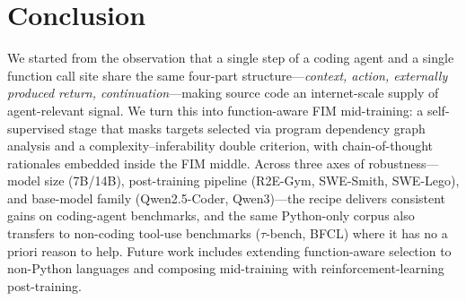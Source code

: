 \section{Conclusion}
\vspace{-0.5ex}
\label{sec:conclusion}

We started from the observation that a single step of a coding agent and
a single function call site share the same four-part structure---\textit{context,
action, externally produced return, continuation}---making source code an
internet-scale supply of agent-relevant signal. We turn this into
function-aware FIM mid-training: a self-supervised stage that masks
targets selected via program dependency graph analysis and a
complexity--inferability double criterion, with chain-of-thought
rationales embedded inside the FIM middle. Across three axes of
robustness---model size (7B/14B), post-training pipeline (R2E-Gym,
SWE-Smith, SWE-Lego), and base-model family (Qwen2.5-Coder, Qwen3)---the
recipe delivers consistent gains on coding-agent benchmarks, and the
same Python-only corpus also transfers to non-coding tool-use benchmarks
($\tau$-bench, BFCL) where it has no a priori reason to help. Future
work includes extending function-aware selection to non-Python languages
and composing mid-training with reinforcement-learning post-training.
